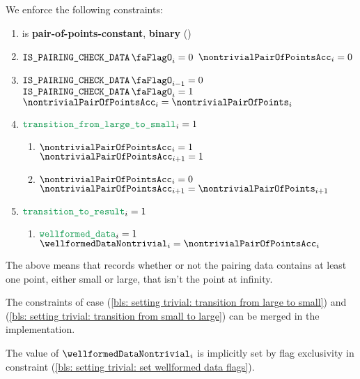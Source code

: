 
We enforce the following constraints:
\begin{enumerate}
    \item \nontrivialPairOfPointsAcc{} is \textbf{pair-of-points-constant}, \textbf{binary} \quad (\trash)
    \item \If $\isBlsPairingCheckData _{i} = 0$ \Then $\nontrivialPairOfPointsAcc _{i} = 0$
    \item \If $\isBlsPairingCheckData _{i - 1} = 0$ \et $\isBlsPairingCheckData _{i} = 1$ \Then $\nontrivialPairOfPointsAcc _{i} = \nontrivialPairOfPoints _{i}$
    \item
        \label{bls: setting trivial: transition from large to small}
        \If $\locTransitionFromLargeToSmall_{i} = 1$ \Then
          \begin{enumerate}
              \item \If $\nontrivialPairOfPointsAcc _{i} = 1$ \Then $\nontrivialPairOfPointsAcc _{i + 1} = 1$
              \item \If $\nontrivialPairOfPointsAcc _{i} = 0$ \Then $\nontrivialPairOfPointsAcc _{i + 1} = \nontrivialPairOfPoints _{i + 1}$
          \end{enumerate}
    \item \If $\locTransitionToResult _{i} = 1$ \Then
    \begin{enumerate}
        \item
            \label{bls: setting trivial: set wellformed data flags}
            \If $\locWellformedData _{i} = 1$ \Then $\wellformedDataNontrivial _{i} = \nontrivialPairOfPointsAcc _{i}$
    \end{enumerate}
\end{enumerate}
\saNote{} The above means that \nontrivialPairOfPointsAcc{} records whether or not the pairing data contains at least one point, either small or large, that isn't the point at infinity.

\saNote{} The constraints of case (\ref{bls: setting trivial: transition from large to small}) and (\ref{bls: setting trivial: transition from small to large}) can be merged in the implementation.

\saNote{} The value of $\wellformedDataNontrivial_{i}$ is implicitly set by flag exclusivity in constraint (\ref{bls: setting trivial: set wellformed data flags}).

